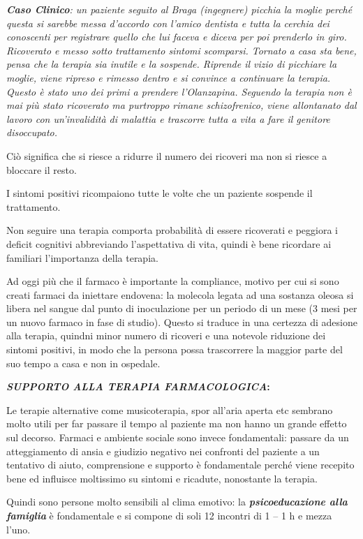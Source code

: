 \documentclass[]{article}
\begin{document}
\emph{\textbf{Caso Clinico}: un paziente seguito al Braga (ingegnere)
picchia la moglie perché questa si sarebbe messa d'accordo con l'amico
dentista e tutta la cerchia dei conoscenti per registrare quello che lui
faceva e diceva per poi prenderlo in giro. Ricoverato e messo sotto
trattamento sintomi scomparsi. Tornato a casa sta bene, pensa che la
terapia sia inutile e la sospende. Riprende il vizio di picchiare la
moglie, viene ripreso e rimesso dentro e si convince a continuare la
terapia. Questo è stato uno dei primi a prendere l'Olanzapina. Seguendo
la terapia non è mai più stato ricoverato ma purtroppo rimane
schizofrenico, viene allontanato dal lavoro con un'invalidità di
malattia e trascorre tutta a vita a fare il genitore disoccupato. }

Ciò significa che si riesce a ridurre il numero dei ricoveri ma non si
riesce a bloccare il resto.

I sintomi positivi ricompaiono tutte le volte che un paziente sospende
il trattamento.

Non seguire una terapia comporta probabilità di essere ricoverati e
peggiora i deficit cognitivi abbreviando l'aspettativa di vita, quindi è
bene ricordare ai familiari l'importanza della terapia.

Ad oggi più che il farmaco è importante la compliance, motivo per cui si
sono creati farmaci da iniettare endovena: la molecola legata ad una
sostanza oleosa si libera nel sangue dal punto di inoculazione per un
periodo di un mese (3 mesi per un nuovo farmaco in fase di studio).
Questo si traduce in una certezza di adesione alla terapia, quindni
minor numero di ricoveri e una notevole riduzione dei sintomi positivi,
in modo che la persona possa trascorrere la maggior parte del suo tempo
a casa e non in ospedale.

\textbf{\emph{SUPPORTO ALLA TERAPIA FARMACOLOGICA}:}

Le terapie alternative come musicoterapia, spor all'aria aperta etc
sembrano molto utili per far passare il tempo al paziente ma non hanno
un grande effetto sul decorso. Farmaci e ambiente sociale sono invece
fondamentali: passare da un atteggiamento di ansia e giudizio negativo
nei confronti del paziente a un tentativo di aiuto, comprensione e
supporto è fondamentale perché viene recepito bene ed influisce
moltissimo su sintomi e ricadute, nonostante la terapia.

Quindi sono persone molto sensibili al clima emotivo: la
\textbf{\emph{psicoeducazione alla famiglia}} è fondamentale e si
compone di soli 12 incontri di 1 -- 1 h e mezza l'uno.
\end{document}
